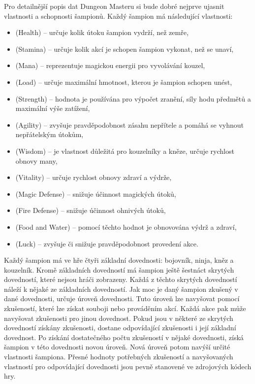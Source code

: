 Pro detailnější popis dat Dungeon Masteru si bude dobré nejprve ujasnit vlastnosti a schopnosti šampionů.
Každý šampion má následující vlastnosti:\label{properties-skills}
\begin{itemize}
\item {} (Health) -- určuje kolik útoku šampion vydrží, než zemře,
\item {} (Stamina) -- určuje kolik akcí je schopen šampion vykonat, než se unaví, 
\item {} (Mana) -- reprezentuje magickou energii pro vyvolávání kouzel, 
\item {} (Load) -- určuje maximální hmotnost, kterou je šampion schopen unést,
\item {} (Strength) --  hodnota je používána pro výpočet zranění, síly hodu předmětů a maximální výše zatížení,
\item {} (Agility) -- zvyšuje pravděpodobnost zásahu nepřítele a pomáhá se vyhnout nepřátelským útokům,
\item {} (Wisdom) -- je vlastnost důležitá pro kouzelníky a kněze, určuje rychlost obnovy many,
\item {} (Vitality) -- určuje rychlost obnovy zdraví a výdrže,
\item {} (Magic Defense) -- snižuje účinnost magických útoků,
\item {} (Fire Defense) -- snižuje účinnost ohnivých útoků,
\item {} (Food and Water) -- pomocí těchto hodnot je obnovována výdrž a zdraví,
\item {} (Luck) -- zvyšuje či snižuje pravděpodobnost provedení akce.
\end{itemize}

Každý šampion má ve hře čtyři základní dovednosti: bojovník, ninja, kněz a kouzelník.
Kromě základních dovedností má šampion ještě šestnáct skrytých dovedností, které nejsou hráči zobrazeny.
Každá z těchto skrytých dovedností náleží k nějaké ze základních dovedností.
Jak moc je daný šampion zkušený v dané dovednosti, určuje úroveň dovednosti. 
Tuto úroveň lze navyšovat pomocí zkušeností, které lze získat souboji nebo prováděním akcí. Každá
akce pak může navyšovat zkušenosti pro jinou dovednost. Pokud jsou v některé ze skrytých dovedností 
získány zkušenosti, dostane odpovídající zkušenosti i její základní dovednost. Po získání dostatečného
počtu zkušeností v nějaké dovednosti, získá šampion v této dovednosti novou úroveň. Nová úroveň potom
navýší určité vlastnosti šampiona. Přesné hodnoty potřebných zkušeností a navyšovaných vlastností pro 
odpovídající dovednosti jsou pevně stanovené ve zdrojových kódech hry.

